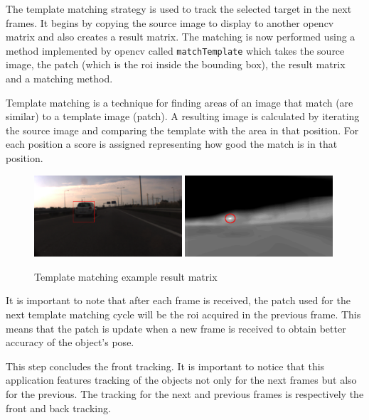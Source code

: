 The template matching strategy is used to track the selected target in the next frames. It begins by copying the source image to display to another \gls{opencv} matrix and also creates a result matrix. The matching is now performed using a method implemented by \gls{opencv} called \texttt{matchTemplate} which takes the source image, the patch (which is the \gls{roi} inside the bounding box), the result matrix and a matching method. 

Template matching is a technique for finding areas of an image that match (are similar) to a template image (patch). A resulting image is calculated by iterating the source image and comparing the template with the area in that position. For each position a score is assigned representing how good the match is in that position.

\begin{figure}[htp]
	
	\centering
	\includegraphics[width=0.49\textwidth]{caplabel/imgs/resultmat.png}\hfill
	\includegraphics[width=0.49\textwidth]{caplabel/imgs/resultmat2.png}
	
	\caption{Template matching example result matrix}
	\label{fig:resultmat}
	
\end{figure}

It is important to note that after each frame is received, the patch used for the next template matching cycle will be the \gls{roi} acquired in the previous frame. This means that the patch is update when a new frame is received to obtain better accuracy of the object's pose. 

This step concludes the front tracking. It is important to notice that this application features tracking of the objects not only for the next frames but also for the previous. The tracking for the next and previous frames is respectively the front and back tracking.

